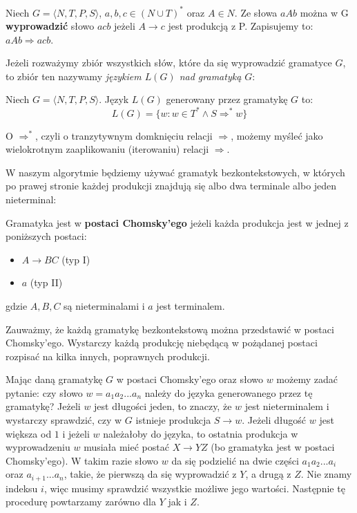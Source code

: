 \begin{definition}
Niech $G = \langle N, T, P, S \rangle$, $a,b,c \in (N \cup T)^*$ oraz $A \in N$.
Ze słowa $aAb$ można w G \textbf{wyprowadzić} słowo $acb$ jeżeli $A \rightarrow c$ jest produkcją z P.
Zapisujemy to: $aAb \Rightarrow acb$.
\end{definition}

Jeżeli rozważymy zbiór wszystkich słów, które da się wyprowadzić gramatyce $G$, to zbiór ten nazywamy \textit{językiem $L(G)$ nad gramatyką $G$}:

\begin{definition}
Niech $G = \langle N, T, P, S \rangle$. Język $L(G)$ generowany przez gramatykę $G$ to:
\[ L(G) = \{w: w\in T^* \land S \Rightarrow^* w \}\]
\end{definition}

O $\Rightarrow^*$, czyli o tranzytywnym domknięciu relacji $\Rightarrow$, możemy myśleć jako wielokrotnym zaaplikowaniu (iterowaniu) relacji $\Rightarrow$.

W naszym algorytmie będziemy używać gramatyk bezkontekstowych, w których po prawej stronie każdej produkcji znajdują się albo dwa terminale albo jeden nieterminal:

\begin{definition}
Gramatyka jest w \textbf{postaci Chomsky'ego} jeżeli każda produkcja jest w jednej z poniższych postaci:
	\begin{itemize}
		\item $A \rightarrow BC$ (typ I)
        \item $a$ (typ II)
	\end{itemize}
gdzie $A,B,C$ są nieterminalami i $a$ jest terminalem.
\end{definition}

Zauważmy, że każdą gramatykę bezkontekstową można przedstawić w postaci Chomsky'ego.
Wystarczy każdą produkcję niebędącą w pożądanej postaci rozpisać na kilka innych, poprawnych produkcji. 

Mając daną gramatykę $G$ w postaci Chomsky'ego oraz słowo $w$ możemy zadać pytanie: czy słowo $w = a_1a_2...a_n$ należy do języka generowanego przez tę gramatykę? 
Jeżeli $w$ jest długości jeden, to znaczy, że $w$ jest nieterminalem i wystarczy sprawdzić, czy w $G$ istnieje produkcja $S \rightarrow w$. 
Jeżeli długość $w$ jest większa od $1$ i jeżeli $w$ należałoby do języka, to ostatnia produkcja w wyprowadzeniu $w$ musiała mieć postać $X \rightarrow YZ$ (bo gramatyka jest w postaci Chomsky'ego).
W takim razie słowo $w$ da się podzielić na dwie części $a_1a_2...a_i$ oraz $a_{i+1}...a_n$, takie, że pierwszą da się wyprowadzić z $Y$, a drugą z $Z$. 
Nie znamy indeksu $i$, więc musimy sprawdzić wszystkie możliwe jego wartości.
Następnie tę procedurę powtarzamy zarówno dla $Y$ jak i $Z$.

